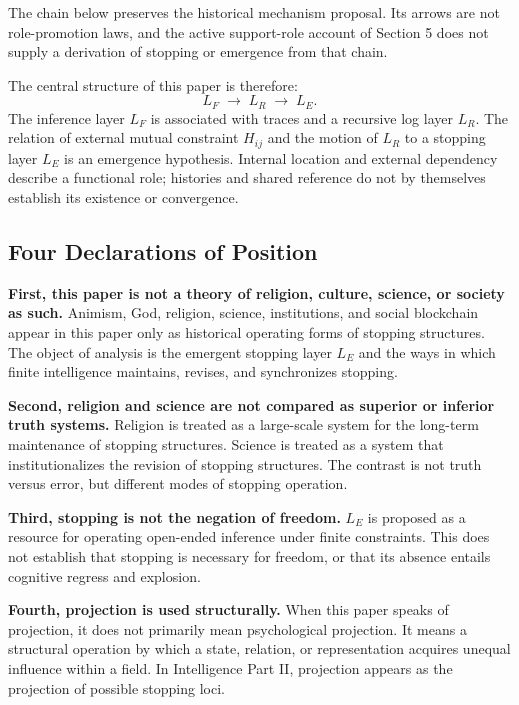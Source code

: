 The chain below preserves the historical mechanism proposal. Its arrows are not role-promotion laws, and the active support-role account of Section 5 does not supply a derivation of stopping or emergence from that chain.

The central structure of this paper is therefore:
\[
L_F \;\longrightarrow\; L_R \;\longrightarrow\; L_E .
\]
The inference layer $L_F$ is associated with traces and a recursive log layer $L_R$. The relation of external mutual constraint $H_{ij}$ and the motion of $L_R$ to a stopping layer $L_E$ is an emergence hypothesis. Internal location and external dependency describe a functional role; histories and shared reference do not by themselves establish its existence or convergence.

\subsection*{Four Declarations of Position}

\textbf{First, this paper is not a theory of religion, culture, science, or society as such.}
Animism, God, religion, science, institutions, and social blockchain appear in this paper only as historical operating forms of stopping structures. The object of analysis is the emergent stopping layer $L_E$ and the ways in which finite intelligence maintains, revises, and synchronizes stopping.

\textbf{Second, religion and science are not compared as superior or inferior truth systems.}
Religion is treated as a large-scale system for the long-term maintenance of stopping structures. Science is treated as a system that institutionalizes the revision of stopping structures. The contrast is not truth versus error, but different modes of stopping operation.

\textbf{Third, stopping is not the negation of freedom.}
$L_E$ is proposed as a resource for operating open-ended inference under finite constraints. This does not establish that stopping is necessary for freedom, or that its absence entails cognitive regress and explosion.

\textbf{Fourth, projection is used structurally.}
When this paper speaks of projection, it does not primarily mean psychological projection. It means a structural operation by which a state, relation, or representation acquires unequal influence within a field. In Intelligence Part II, projection appears as the projection of possible stopping loci.

